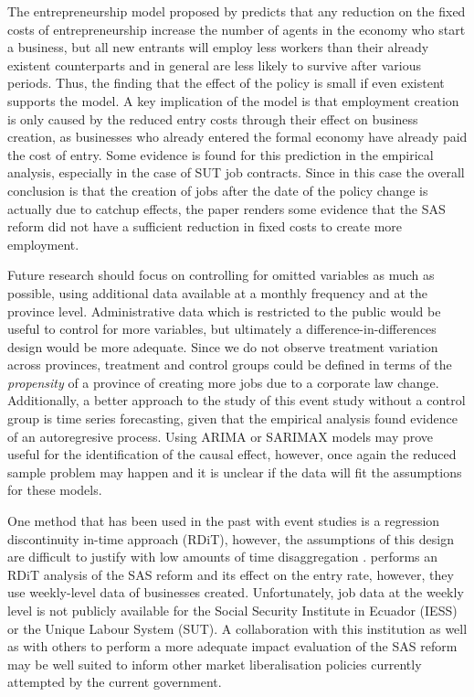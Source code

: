 \documentclass[11pt,a4paper]{article}\usepackage[]{graphicx}\usepackage[]{xcolor}
\begin{document}
The entrepreneurship model proposed by \textcite{Branstetter.2014} predicts that any reduction on the fixed costs of entrepreneurship increase the number of agents in the economy who start a business, but all new entrants will employ less workers than their already existent counterparts and in general are less likely to survive after various periods. Thus, the finding that the effect of the policy is small if even existent supports the model. A key implication of the model is that employment creation is only caused by the reduced entry costs through their effect on business creation, as businesses who already entered the formal economy have already paid the cost of entry. Some evidence is found for this prediction in the empirical analysis, especially in the case of SUT job contracts. Since in this case the overall conclusion is that the creation of jobs after the date of the policy change is actually due to catchup effects, the paper renders some evidence that the SAS reform did not have a sufficient reduction in fixed costs to create more employment.  

Future research should focus on controlling for omitted variables as much as possible, using additional data available at a monthly frequency and at the province level. Administrative data which is restricted to the public would be useful to control for more variables, but ultimately a difference-in-differences design would be more adequate. Since we do not observe treatment variation across provinces, treatment and control groups could be defined in terms of the \textit{propensity} of a province of creating more jobs due to a corporate law change. Additionally, a better approach to the study of this event study without a control group is time series forecasting, given that the empirical analysis found evidence of an autoregresive process. Using ARIMA or SARIMAX models may prove useful for the identification of the causal effect, however, once again the reduced sample problem may happen and it is unclear if the data will fit the assumptions for these models.

One method that has been used in the past with event studies is a regression discontinuity in-time approach (RDiT), however, the assumptions of this design are difficult to justify with low amounts of time disaggregation \parencite{Hausman.2018}. \textcite{CaminoMogro.2022} performs an RDiT analysis of the SAS reform and its effect on the entry rate, however, they use weekly-level data of businesses created. Unfortunately, job data at the weekly level is not publicly available for the Social Security Institute in Ecuador (IESS) or the Unique Labour System (SUT). A collaboration with this institution as well as with others to perform a more adequate impact evaluation of the SAS reform may be well suited to inform other market liberalisation policies currently attempted by the current government. 
\end{document}
